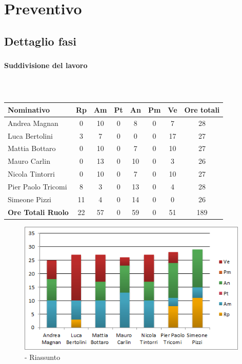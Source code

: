 \documentclass[../PianoDiProgetto.tex]{subfiles}
\begin{document}
\newpage
	\section{Preventivo}
		\subsection{Dettaglio fasi}
			\subsubsection{\PerAR}
				\paragraph{Suddivisione del lavoro}\
	\begin{table}[H]
		\begin{tabularx}{\textwidth}{l*{6}{c}c}
			\toprule
			\textbf{Nominativo} & \textbf{Rp} & \textbf{Am} & \textbf{Pt} 
						& \textbf{An} & \textbf{Pm} & \textbf{Ve} & \textbf{Ore totali} \\
			\midrule
			Andrea Magnan & 0 & 10 &	0 &	8 & 0 & 7 & 28 \\
			Luca Bertolini & 3 & 7 & 0 & 0 & 0 & 17 & 27 \\
			Mattia Bottaro &	0 &	10 & 0 & 7 & 0 & 10 & 27 \\
			Mauro Carlin & 0 & 13 &	0 &	10 & 0 & 3 & 26 \\
			Nicola Tintorri &	0 & 10 & 0 & 7 & 0 & 10 & 27 \\
			Pier Paolo Tricomi & 8 & 3 &	0 &	13 & 0 & 4 & 28 \\
			Simeone Pizzi & 11 & 4 & 0 & 14 & 0 & 0 & 26 \\
			\midrule			
			\textbf{Ore Totali Ruolo} & 22 & 57 & 0 & 59 &	0 &	51 & 189 \\
			\bottomrule
		\end{tabularx}
		\caption{\PerAR}
	\end{table}
	
	\vspace{15 mm}	
	
	\begin{figure}[H]
		\centering
		\includegraphics[width=11cm, trim=1cm 0cm 1cm 0cm]{grafici/AR-persona}
			\caption{\PerAR{} - Riassunto}
	\end{figure}	
	
\end{document}
